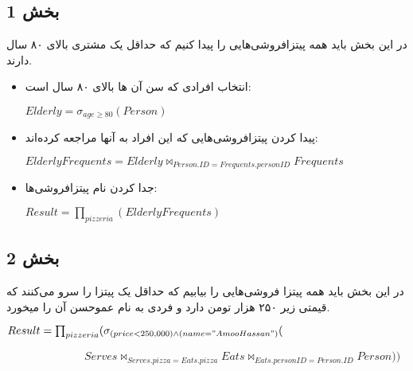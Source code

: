 \subsection*{بخش 1}
در این بخش باید همه پیتزافروشی‌هایی را پیدا کنیم که حداقل یک مشتری بالای ۸۰ سال دارند.
\begin{itemize}	
	\item انتخاب افرادی که سن آن ها بالای ۸۰ سال است:
	
	\setLTR
	$Elderly = \sigma_{age \geq 80} (Person)$
	\setRTL
	\item پیدا کردن پیتزافروشی‌هایی که این افراد به آنها مراجعه کرده‌اند:
	
	\setLTR
	$ElderlyFrequents = Elderly \bowtie_{Person.ID=Frequents.personID} Frequents$
	\setRTL
	
	\item جدا کردن نام پیتزافروشی‌ها:
	
	\setLTR
	$Result = \prod_{pizzeria} (ElderlyFrequents)$
	\setRTL
\end{itemize}




\subsection*{بخش 2}
در این بخش باید همه پیتزا فروشی‌هایی را بیابیم که حداقل یک پیتزا را سرو می‌کنند که قیمتی زیر ۲۵۰ هزار
تومن دارد و فردی به نام عموحسن آن را میخورد.

	\setLTR
	$Result = \prod_{pizzeria}(\sigma_{(price<250,000)\land(name="Amoo Hassan")}($
	
	$\qquad \qquad \qquad \quad  Serves\bowtie_{Serves.pizza=Eats.pizza}Eats \bowtie_{Eats.personID=Person.ID}Person))$

	\setRTL


